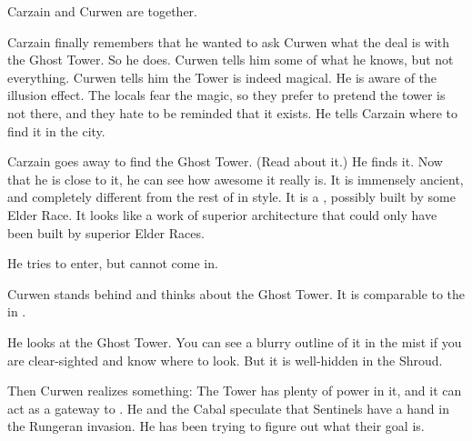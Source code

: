 





\begin{comment}
  \section{Carzain asks Curwen about Ghost Tower}
\end{comment}
Carzain and Curwen are together. 

Carzain finally remembers that he wanted to ask Curwen what the deal is with the Ghost Tower. 
So he does.
Curwen tells him some of what he knows, but not everything. 
Curwen tells him the Tower is indeed magical. 
He is aware of the illusion effect. 
The locals fear the magic, so they prefer to pretend the tower is not there, and they hate to be reminded that it exists.
He tells Carzain where to find it in the city. 

Carzain goes away to find the Ghost Tower. 
(Read about it.)
He finds it.
Now that he is close to it, he can see how awesome it really is. 
It is immensely ancient, and completely different from the rest of \Forclin in style. 
It is a , possibly built by some Elder Race. 
It looks like a work of superior architecture that could only have been built by superior Elder Races.

He tries to enter, but cannot come in. 





\begin{comment}
  \section{Curwen thinks Rungerans want Ghost Tower}
\end{comment}
\new
Curwen stands behind and thinks about the Ghost Tower. 
It is comparable to the  in \Malcur. 

He looks at the Ghost Tower. 
You can see a blurry outline of it in the mist if you are clear-sighted and know where to look. 
But it is well-hidden in the Shroud. 

Then Curwen realizes something: 
The Tower has plenty of power in it, and it can act as a gateway to \Nyx. 
He and the Cabal speculate that Sentinels have a hand in the Rungeran invasion. 
He has been trying to figure out what their goal is.

